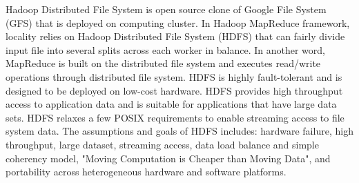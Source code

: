 
Hadoop Distributed File System \cite{HDFS} is open source clone of Google File System (GFS) \cite{ghemawat2003google} that is deployed on computing cluster. In Hadoop MapReduce framework, locality relies on Hadoop Distributed File System (HDFS) that can fairly divide input file into several splits across each worker in balance. In another word, MapReduce is built on the distributed file system and executes read/write operations through distributed file system. HDFS is highly fault-tolerant and is designed to be deployed on low-cost hardware. HDFS provides high throughput access to application data and is suitable for applications that have large data sets. HDFS relaxes a few POSIX requirements to enable streaming access to file system data. \cite{HDFS} The assumptions and goals of HDFS includes: hardware failure, high throughput, large dataset, streaming access, data load balance and simple coherency model, "Moving Computation is Cheaper than Moving Data", and portability across heterogeneous hardware and software platforms. 



